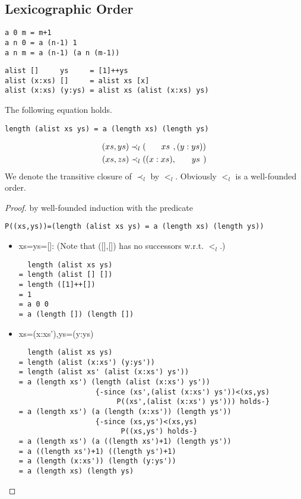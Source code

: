 \subsection{Lexicographic Order}
\begin{verbatim}
a 0 m = m+1
a n 0 = a (n-1) 1
a n m = a (n-1) (a n (m-1))
\end{verbatim}
\begin{verbatim}
alist []     ys     = [1]++ys
alist (x:xs) []     = alist xs [x]
alist (x:xs) (y:ys) = alist xs (alist (x:xs) ys)
\end{verbatim}
\begin{claim}The following equation holds.
\begin{verbatim}
length (alist xs ys) = a (length xs) (length ys)
\end{verbatim}
\end{claim}
\begin{align*}
(xs,ys)&\prec_l(\hphantom{(x:\ }xs\hphantom{)},(y:ys))\\
(xs,zs)&\prec_l((x:xs),\hphantom{(x:\ }ys\hphantom{)})
\end{align*}
We denote the transitive closure of $\prec_l$ by $<_l$. Obviously $<_l$ is a well-founded order.
\begin{proof} by well-founded induction with the predicate 
\begin{verbatim}
P((xs,ys))=(length (alist xs ys) = a (length xs) (length ys))
\end{verbatim}
\begin{itemize}
\item[] xs=ys=[]: (Note that ([],[]) has no successors w.r.t. $<_l$.)
\begin{verbatim}
  length (alist xs ys)
= length (alist [] [])
= length ([1]++[])
= 1
= a 0 0
= a (length []) (length [])
\end{verbatim}
\item[] xs=(x:xs'),ys=(y:ys)
\begin{verbatim}
  length (alist xs ys)
= length (alist (x:xs') (y:ys')) 
= length (alist xs' (alist (x:xs') ys'))
= a (length xs') (length (alist (x:xs') ys')) 
                  {-since (xs',(alist (x:xs') ys'))<(xs,ys) 
                       P((xs',(alist (x:xs') ys'))) holds-}
= a (length xs') (a (length (x:xs')) (length ys'))
                  {-since (xs,ys')<(xs,ys) 
                        P((xs,ys') holds-}
= a (length xs') (a ((length xs')+1) (length ys'))
= a ((length xs')+1) ((length ys')+1)
= a (length (x:xs')) (length (y:ys'))
= a (length xs) (length ys)
\end{verbatim}
\end{itemize}
\end{proof}
